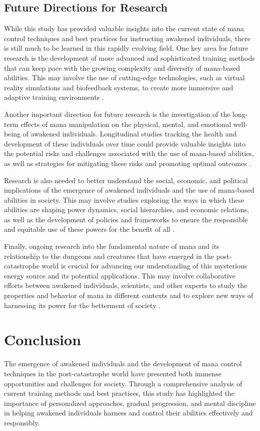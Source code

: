 \documentclass[12pt, a4paper]{article}
\begin{document}
\subsection{Future Directions for Research}
While this study has provided valuable insights into the current state of mana control techniques and best practices for instructing awakened individuals, there is still much to be learned in this rapidly evolving field. One key area for future research is the development of more advanced and sophisticated training methods that can keep pace with the growing complexity and diversity of mana-based abilities. This may involve the use of cutting-edge technologies, such as virtual reality simulations and biofeedback systems, to create more immersive and adaptive training environments \cite{Nakano2027}.

Another important direction for future research is the investigation of the long-term effects of mana manipulation on the physical, mental, and emotional well-being of awakened individuals. Longitudinal studies tracking the health and development of these individuals over time could provide valuable insights into the potential risks and challenges associated with the use of mana-based abilities, as well as strategies for mitigating these risks and promoting optimal outcomes \cite{Lee2027}.

Research is also needed to better understand the social, economic, and political implications of the emergence of awakened individuals and the use of mana-based abilities in society. This may involve studies exploring the ways in which these abilities are shaping power dynamics, social hierarchies, and economic relations, as well as the development of policies and frameworks to ensure the responsible and equitable use of these powers for the benefit of all \cite{Kowalczyk2027}.

Finally, ongoing research into the fundamental nature of mana and its relationship to the dungeons and creatures that have emerged in the post-catastrophe world is crucial for advancing our understanding of this mysterious energy source and its potential applications. This may involve collaborative efforts between awakened individuals, scientists, and other experts to study the properties and behavior of mana in different contexts and to explore new ways of harnessing its power for the betterment of society \cite{Adesina2027}.

\section{Conclusion}
The emergence of awakened individuals and the development of mana control techniques in the post-catastrophe world have presented both immense opportunities and challenges for society. Through a comprehensive analysis of current training methods and best practices, this study has highlighted the importance of personalized approaches, gradual progression, and mental discipline in helping awakened individuals harness and control their abilities effectively and responsibly.
\end{document}

